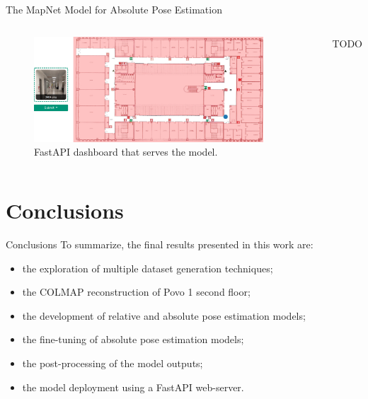 \documentclass[
    center,
]{beamer}
\begin{document}
\begin{frame}{The MapNet Model for Absolute Pose Estimation}
    \begin{columns}
        \begin{figure}
            \centering
            \includegraphics[width=0.9\textwidth]{../imgs/dashboard.png}
            \caption{FastAPI dashboard that serves the model.}
        \end{figure}

        TODO
    \end{columns}
\end{frame}

\section{Conclusions}
\begin{frame}{Conclusions}
    To summarize, the final results presented in this work are:
    \begin{itemize}
        \item the exploration of multiple dataset generation techniques;
        \item the COLMAP reconstruction of Povo 1 second floor;
        \item the development of relative and absolute pose estimation models;
        \item the fine-tuning of absolute pose estimation models;
        \item the post-processing of the model outputs;
        \item the model deployment using a FastAPI web-server. 
    \end{itemize}
\end{frame}

\end{document}
